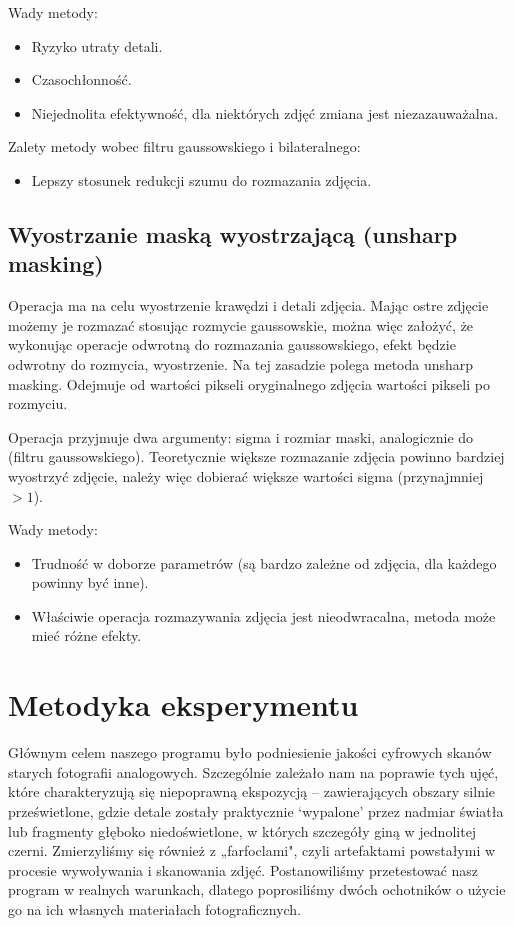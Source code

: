 \documentclass[]{mwart}
\begin{document}
Wady metody:
\begin{itemize}
    \item Ryzyko utraty detali.
    \item Czasochłonność.
    \item Niejednolita efektywność, dla niektórych zdjęć zmiana jest niezazauważalna.

\end{itemize}
Zalety metody wobec filtru gaussowskiego i bilateralnego:
\begin{itemize}
    \item Lepszy stosunek redukcji szumu do rozmazania zdjęcia.
\end{itemize}




\subsection{Wyostrzanie maską wyostrzającą (unsharp masking)}
Operacja ma na celu wyostrzenie krawędzi i detali zdjęcia. Mając ostre zdjęcie możemy je
rozmazać stosując rozmycie gaussowskie, można więc założyć, że wykonując operacje odwrotną do
rozmazania gaussowskiego, efekt będzie odwrotny do rozmycia, wyostrzenie. Na tej zasadzie
polega metoda unsharp masking. Odejmuje od wartości pikseli oryginalnego zdjęcia wartości
pikseli po rozmyciu.

Operacja przyjmuje dwa argumenty: sigma i rozmiar maski, analogicznie do (filtru gaussowskiego).
Teoretycznie większe rozmazanie zdjęcia powinno bardziej wyostrzyć zdjęcie, należy więc dobierać
większe wartości sigma (przynajmniej $>1$). \newline

Wady metody:
\begin{itemize}
    \item Trudność w doborze parametrów (są bardzo zależne od zdjęcia, dla każdego powinny być inne).
    \item Właściwie operacja rozmazywania zdjęcia jest nieodwracalna, metoda może mieć różne efekty.
\end{itemize}





\newpage
\section{Metodyka eksperymentu}

Głównym celem naszego programu było podniesienie jakości cyfrowych skanów starych fotografii analogowych. Szczególnie zależało nam na poprawie tych ujęć, które charakteryzują się niepoprawną ekspozycją -- zawierających obszary silnie prześwietlone, gdzie detale zostały praktycznie `wypalone' przez nadmiar światła lub fragmenty głęboko niedoświetlone, w których szczegóły giną w jednolitej czerni. Zmierzyliśmy się również z „farfoclami", czyli artefaktami powstałymi w procesie wywoływania i skanowania zdjęć. Postanowiliśmy przetestować nasz program w realnych warunkach, dlatego poprosiliśmy dwóch ochotników o użycie go na ich własnych materiałach fotograficznych. \newline
\end{document}
